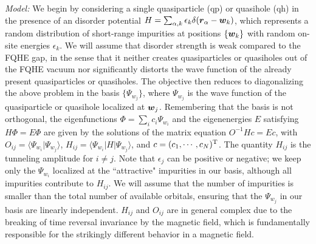 \documentclass[twocolumn,floatfix,prb,aps,showpacs]{revtex4-2}
\renewcommand{\vec}[1]{\mbox{\boldmath$#1$}}
\begin{document}
{\it Model:} We begin by considering a single quasiparticle (qp) or quasihole (qh) in the presence of an 
disorder potential $H=\sum_{\alpha,k} \epsilon_k \delta(\vec{r}_\alpha-\vec{w}_k)$, which represents a random distribution of short-range impurities
at positions $\{\vec{w}_k\}$ with random on-site energies $\epsilon_k$.  We will assume that disorder strength is weak compared to the FQHE gap, in the sense that it neither creates quasiparticles or quasiholes out of the FQHE vacuum nor significantly distorts the wave function of the already present quasiparticles or quasiholes. The objective then reduces to diagonalizing the above problem in the basis $\{ \Psi_{w_j} \}$, where $\Psi_{w_j}$ is the wave function of the quasiparticle or quasihole 
localized at $\vec{w}_j$. Remembering that the basis is not orthogonal, the eigenfunctions $\Phi=\sum_i c_i \Psi_{w_i}$ and the eigenenergies $E$ satisfying $H\Phi=E\Phi$ are given by the solutions of the matrix equation $O^{-1}H c=E c$, with $O_{ij}=\langle \Psi_{w_i} | \Psi_{w_j}\rangle$, $H_{ij}=\langle \Psi_{w_i} |H| \Psi_{w_j}\rangle$, and $c=(c_1, \cdots, c_N)^{\rm T}$. The quantity $H_{ij}$ is the tunneling amplitude for $i\neq j$. Note that $\epsilon_j$ can be positive or negative; we keep only the $\Psi_{w_i}$ localized at  the ``attractive" impurities in our basis, although all impurities contribute to $H_{ij}$. We will assume that the number of impurities is smaller than the total number of available orbitals, ensuring that the $\Psi_{w_j}$ in our basis are linearly independent. $H_{ij}$ and $O_{ij}$ are in general complex due to the breaking of time reversal invariance by the magnetic field, which is fundamentally responsible for the strikingly different behavior in a magnetic field. 
\end{document}

